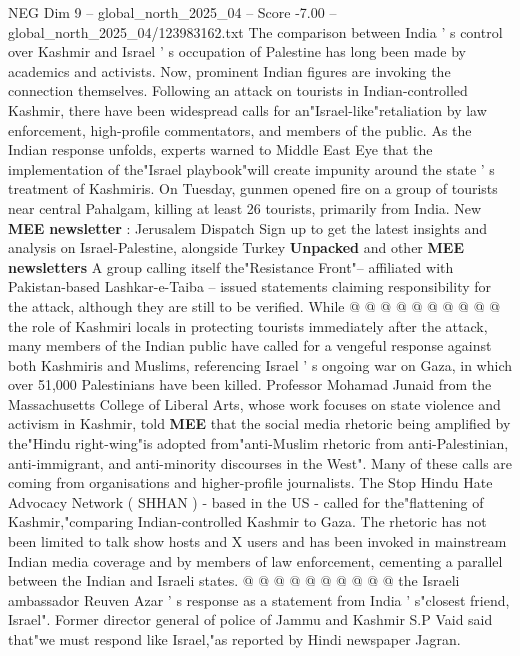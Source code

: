 \begin{textsample}{NEG Dim 9 – global\_north\_2025\_04 – Score -7.00 – global\_north\_2025\_04/123983162.txt}  \label{ex:f9_neg_027}
The comparison between India ' s control over Kashmir and Israel ' s occupation of Palestine has long been made by academics and activists.
Now, prominent Indian figures are invoking the connection themselves.
Following an attack on tourists in Indian-controlled Kashmir, there have been widespread calls for an"Israel-like"retaliation by law enforcement, high-profile commentators, and members of the public.
As the Indian response unfolds, experts warned to Middle East Eye that the implementation of the"Israel playbook"will create impunity around the state ' s treatment of Kashmiris.
On Tuesday, gunmen opened fire on a group of tourists near central Pahalgam, killing at least 26 tourists, primarily from India.
New \textbf{MEE} \textbf{newsletter} : Jerusalem Dispatch Sign up to get the latest insights and analysis on Israel-Palestine, alongside Turkey \textbf{Unpacked} and other \textbf{MEE} \textbf{newsletters} A group calling itself the"Resistance Front"-- affiliated with Pakistan-based Lashkar-e-Taiba -- issued statements claiming responsibility for the attack, although they are still to be verified.
While @ @ @ @ @ @ @ @ @ @ the role of Kashmiri locals in protecting tourists immediately after the attack, many members of the Indian public have called for a vengeful response against both Kashmiris and Muslims, referencing Israel ' s ongoing war on Gaza, in which over 51,000 Palestinians have been killed.
Professor Mohamad Junaid from the Massachusetts College of Liberal Arts, whose work focuses on state violence and activism in Kashmir, told \textbf{MEE} that the social media rhetoric being amplified by the"Hindu right-wing"is adopted from"anti-Muslim rhetoric from anti-Palestinian, anti-immigrant, and anti-minority discourses in the West".
Many of these calls are coming from organisations and higher-profile journalists.
The Stop Hindu Hate Advocacy Network ( SHHAN ) - based in the US - called for the"flattening of Kashmir,"comparing Indian-controlled Kashmir to Gaza.
The rhetoric has not been limited to talk show hosts and X users and has been invoked in mainstream Indian media coverage and by members of law enforcement, cementing a parallel between the Indian and Israeli states. @ @ @ @ @ @ @ @ @ @ the Israeli ambassador Reuven Azar ' s response as a statement from India ' s"closest friend, Israel".
Former director general of police of Jammu and Kashmir S.P Vaid said that"we must respond like Israel,"as reported by Hindi newspaper Jagran.

\end{textsample}
